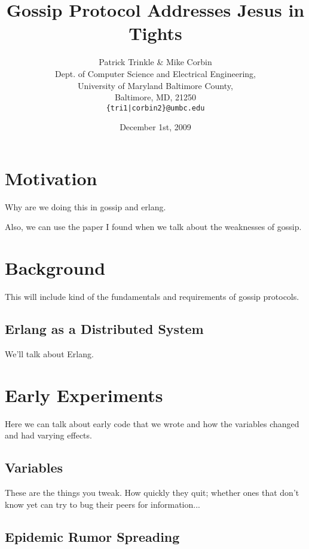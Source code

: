 \documentclass[11pt,twocolumn]{article}
\title{Gossip Protocol Addresses Jesus in Tights}
\author{Patrick Trinkle \& Mike Corbin\\
Dept. of Computer Science and Electrical Engineering,\\
University of Maryland Baltimore County,\\
Baltimore, MD, 21250\\
\texttt{\{tri1|corbin2\}@umbc.edu}}
\date{December 1st, 2009}
\begin{document}

\section{Motivation}

Why are we doing this in gossip and erlang.

Also, we can use the paper I found when we talk about the weaknesses of gossip.

\section{Background}

This will include kind of the fundamentals and requirements of gossip protocols.

\subsection{Erlang as a Distributed System}

We'll talk about Erlang.

\section{Early Experiments}

Here we can talk about early code that we wrote and how the variables changed 
and had varying effects.

\subsection{Variables}

These are the things you tweak.  How quickly they quit; whether ones that don't 
know yet can try to bug their peers for information...

\subsection{Epidemic Rumor Spreading}
\end{document}
